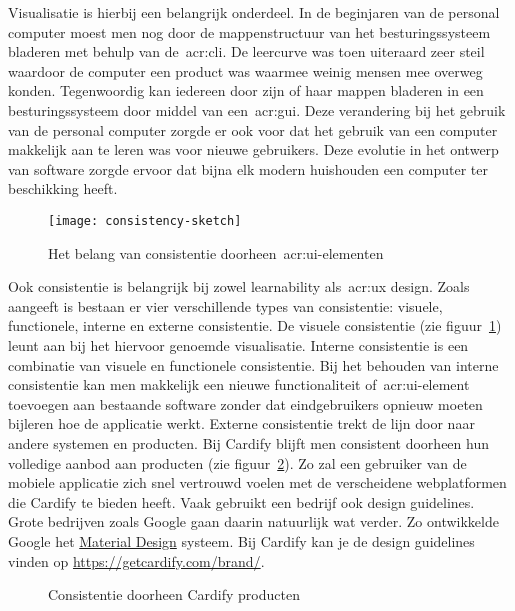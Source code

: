 Visualisatie is hierbij een belangrijk onderdeel. In de beginjaren van de personal computer moest men nog door de mappenstructuur van het besturingssysteem bladeren met behulp van de~\acrlong{acr:cli}. De leercurve was toen uiteraard zeer steil waardoor de computer een product was waarmee weinig mensen mee overweg konden. Tegenwoordig kan iedereen door zijn of haar mappen bladeren in een besturingssysteem door middel van een~\acrlong{acr:gui}. Deze verandering bij het gebruik van de personal computer zorgde er ook voor dat het gebruik van een computer makkelijk aan te leren was voor nieuwe gebruikers. Deze evolutie in het ontwerp van software zorgde ervoor dat bijna elk modern huishouden een computer ter beschikking heeft.

\begin{figure}[h]
    \centering
    \texttt{[image: consistency-sketch]}
    \caption[Consistentie doorheen~\acrshort{acr:ui}-elementen]{Het belang van consistentie doorheen~\acrshort{acr:ui}-elementen}
    \label{fig:learnability:consistentie}
\end{figure}

Ook consistentie is belangrijk bij zowel learnability als~\acrshort{acr:ux} design. Zoals~\textcite{Nikolov2017} aangeeft is bestaan er vier verschillende types van consistentie: visuele, functionele, interne en externe consistentie. De visuele consistentie (zie figuur~\ref{fig:learnability:consistentie}) leunt aan bij het hiervoor genoemde visualisatie. Interne consistentie is een combinatie van visuele en functionele consistentie. Bij het behouden van interne consistentie kan men makkelijk een nieuwe functionaliteit of~\acrshort{acr:ui}-element toevoegen aan bestaande software zonder dat eindgebruikers opnieuw moeten bijleren hoe de applicatie werkt. Externe consistentie trekt de lijn door naar andere systemen en producten. Bij Cardify blijft men consistent doorheen hun volledige aanbod aan producten (zie figuur~\ref{fig:learnability:consistentie-cardify}). Zo zal een gebruiker van de mobiele applicatie zich snel vertrouwd voelen met de verscheidene webplatformen die Cardify te bieden heeft. Vaak gebruikt een bedrijf ook design guidelines. Grote bedrijven zoals Google gaan daarin natuurlijk wat verder. Zo ontwikkelde Google het \href{https://material.io/}{Material Design} systeem. Bij Cardify kan je de design guidelines vinden op \url{https://getcardify.com/brand/}.

\begin{figure}
    \centering
    \qquad
    \caption{Consistentie doorheen Cardify producten}
    \label{fig:learnability:consistentie-cardify}
\end{figure}

